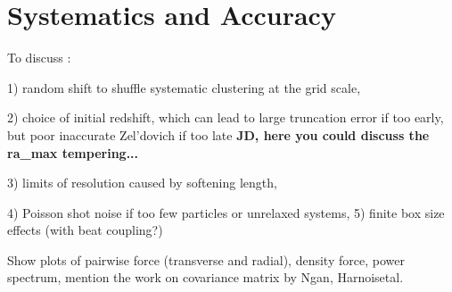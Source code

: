 \section{Systematics and Accuracy}
\label{sec:systematics}

To discuss : 

1) random shift to shuffle systematic clustering at the grid scale, 

2) choice of initial redshift, which can lead to large truncation error if too early, but poor inaccurate Zel'dovich if too late 
{\bf JD, here you could discuss the ra\_max tempering...} 

3) limits of resolution caused by softening length,

4) Poisson shot noise if too few particles or unrelaxed systems, 5) finite box size effects (with beat coupling?)
 
Show plots of pairwise force (transverse and radial), density force, power spectrum, 
mention the work on covariance matrix by Ngan, Harnoisetal.



